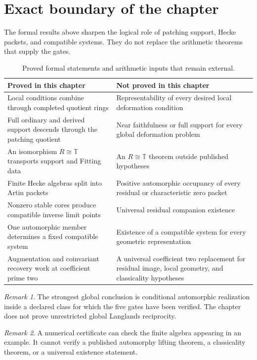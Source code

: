 \documentclass[11pt]{amsart}
\theoremstyle{definition}
\theoremstyle{remark}
\newtheorem{remark}[remark]{Remark}
\newcommand{\TT}{\mathbb T}
\begin{document}
\section{Exact boundary of the chapter}\label{sec:boundary}

The formal results above sharpen the logical role of patching support, Hecke packets, and compatible systems. They do not replace the arithmetic theorems that supply the gates.

\begin{table}[t]
\centering
\caption{Proved formal statements and arithmetic inputs that remain external.}
\label{tab:boundary}
\begin{tabular}{p{}p{}}
\toprule
Proved in this chapter & Not proved in this chapter\\
\midrule
Local conditions combine through completed quotient rings & Representability of every desired local deformation condition\\
Full ordinary and derived support descends through the patching quotient & Near faithfulness or full support for every global deformation problem\\
An isomorphism \(R\cong\TT\) transports support and Fitting data & An \(R\cong\TT\) theorem outside published hypotheses\\
Finite Hecke algebras split into Artin packets & Positive automorphic occupancy of every residual or characteristic zero packet\\
Nonzero stable cores produce compatible inverse limit points & Universal residual companion existence\\
One automorphic member determines a fixed compatible system & Existence of a compatible system for every geometric representation\\
Augmentation and coinvariant recovery work at coefficient prime two & A universal coefficient two replacement for residual image, local geometry, and classicality hypotheses\\
\bottomrule
\end{tabular}
\end{table}

\begin{remark}
The strongest global conclusion is conditional automorphic realization inside a declared class for which the five gates have been verified. The chapter does not prove unrestricted global Langlands reciprocity.
\end{remark}

\begin{remark}
A numerical certificate can check the finite algebra appearing in an example. It cannot verify a published automorphy lifting theorem, a classicality theorem, or a universal existence statement.
\end{remark}
\end{document}
